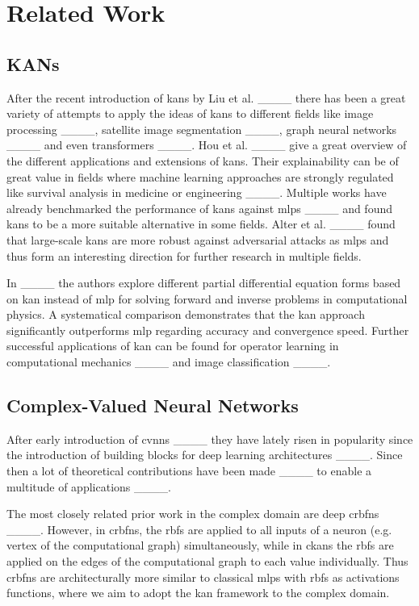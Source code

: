 \section{Related Work}
\subsection{KANs}
After the recent introduction of \acp{kan} by Liu et al. ____ there has been a great variety of attempts to apply the ideas of \acp{kan} to different fields like image processing ____, satellite image segmentation ____, graph neural networks ____ and even transformers ____. Hou et al. ____ give a great overview of the different applications and extensions of \acp{kan}. Their explainability can be of great value in fields where machine learning approaches are strongly regulated like survival analysis in medicine or engineering ____. Multiple works have already benchmarked the performance of \acp{kan} against \acp{mlp} ____ and found \acp{kan} to be a more suitable alternative in some fields. Alter et al. ____ found that large-scale \acp{kan} are more robust against adversarial attacks as \acp{mlp} and thus form an interesting direction for further research in multiple fields.


In ____ the authors explore different partial differential equation forms based on \ac{kan} instead of \ac{mlp} for solving forward and inverse problems in computational physics. A systematical comparison demonstrates that the \ac{kan} approach significantly outperforms \ac{mlp} regarding accuracy and convergence 
speed. Further successful applications of \ac{kan} can be found for operator learning in computational mechanics ____ and image classification ____.


\subsection{Complex-Valued Neural Networks}
After early introduction of \acp{cvnn} ____ they have lately risen in popularity since the introduction of building blocks for deep learning architectures ____. Since then a lot of theoretical contributions have been made ____ to enable a multitude of applications ____.

The most closely related prior work in the complex domain are deep \acp{crbfn} ____. However, in \acp{crbfn}, the \acp{rbf} are applied to all inputs of a neuron (e.g. vertex of the computational graph) simultaneously, while in \acp{ckan} the \acp{rbf} are applied on the edges of the computational graph to each value individually. Thus \acp{crbfn} are architecturally more similar to classical \acp{mlp} with \acp{rbf} as activations functions, where we aim to adopt the \ac{kan} framework to the complex domain.